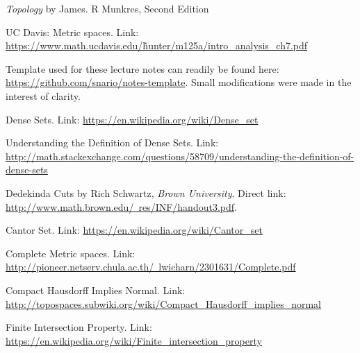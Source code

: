 \documentclass[english, 11pt]{article}
\begin{document}
\begin{thebibliography}{9}
\textit{Topology} by James. R Munkres, Second Edition

UC Davis: Metric spaces. Link: \href{https://www.math.ucdavis.edu/~hunter/m125a/intro_analysis_ch7.pdf}{https://www.math.ucdavis.edu/\~hunter/m125a/intro\_analysis\_ch7.pdf}

Template used for these lecture notes can readily be found here: \href{https://github.com/snario/notes-template}{https://github.com/snario/notes-template}. Small modifications were made in the interest of clarity.

Dense Sets. Link: \href{https://en.wikipedia.org/wiki/Dense_set}{https://en.wikipedia.org/wiki/Dense\_set}

Understanding the Definition of Dense Sets. Link: \href{http://math.stackexchange.com/questions/58709/understanding-the-definition-of-dense-sets}{http://math.stackexchange.com/questions/58709/understanding-the-definition-of-dense-sets}

Dedekinda Cuts by Rich Schwartz, \textit{Brown University}. Direct link: \href{http://www.math.brown.edu/~res/INF/handout3.pdf}{http://www.math.brown.edu/~res/INF/handout3.pdf}.

Cantor Set. Link: \href{https://en.wikipedia.org/wiki/Cantor_set}{https://en.wikipedia.org/wiki/Cantor\_set}

Complete Metric spaces. Link: \href{http://pioneer.netserv.chula.ac.th/~lwicharn/2301631/Complete.pdf}{http://pioneer.netserv.chula.ac.th/~lwicharn/2301631/Complete.pdf}

Compact Hausdorff Implies Normal. Link: \href{http://topospaces.subwiki.org/wiki/Compact_Hausdorff_implies_normal}{http://topospaces.subwiki.org/wiki/Compact\_Hausdorff\_implies\_normal}

Finite Intersection Property. Link: \href{https://en.wikipedia.org/wiki/Finite_intersection_property}{https://en.wikipedia.org/wiki/Finite\_intersection\_property}

\end{thebibliography}

  
\end{document}
